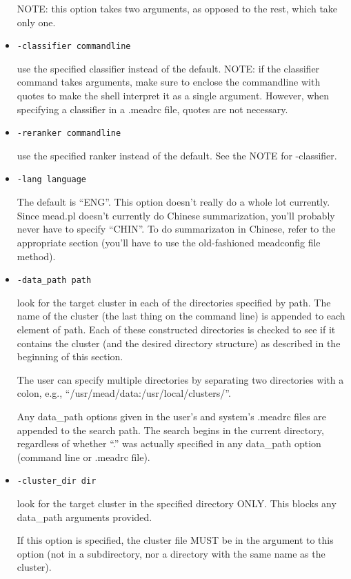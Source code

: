 \documentclass[10pt]{article}
\begin{document}
\begin{itemize}
  NOTE: this option takes two
  arguments, as opposed to the rest, which take only one.

\item \verb|-classifier commandline|
  
  use the specified classifier instead of the default.
  NOTE: if the classifier command takes arguments, make sure to enclose
  the commandline with quotes to make the shell interpret it as a single 
  argument.  However, when specifying a classifier in a .meadrc file,
  quotes are not necessary.

\item \verb|-reranker commandline|

  use the specified ranker instead of the default.
  See the NOTE for -classifier.

\item \verb|-lang language|

  The default is ``ENG''.
  This option doesn't really do a whole lot currently.  
  Since mead.pl doesn't currently do Chinese 
  summarization, you'll probably never have to specify ``CHIN''.
  To do summarizaton in Chinese, refer to the appropriate section
  (you'll have to use the old-fashioned meadconfig file method).

\item \verb|-data_path path|

  look for the target cluster in each of the directories specified by
  path.  The name of the cluster (the last thing on the command line)
  is appended to each element of path.  Each of these constructed 
  directories is checked to see if it contains the cluster (and the 
  desired directory structure) as described in the beginning of this
  section.

  The user can specify multiple directories by separating two
  directories with a colon, e.g., ``/usr/mead/data:\-/usr/local/clusters/''.

  Any data\_path options given in the user's and system's .meadrc files
  are appended to the search path.  The search begins in the current 
  directory, regardless of whether ``.'' was actually specified in
  any data\_path option (command line or .meadrc file).

\item \verb|-cluster_dir dir|

  look for the target cluster in the specified directory ONLY.
  This blocks any data\_path arguments provided.
  
  If this option is specified, the cluster file MUST be in the
  argument to this option (not in a subdirectory, nor a directory
  with the same name as the cluster).


\end{itemize}
\end{document}
